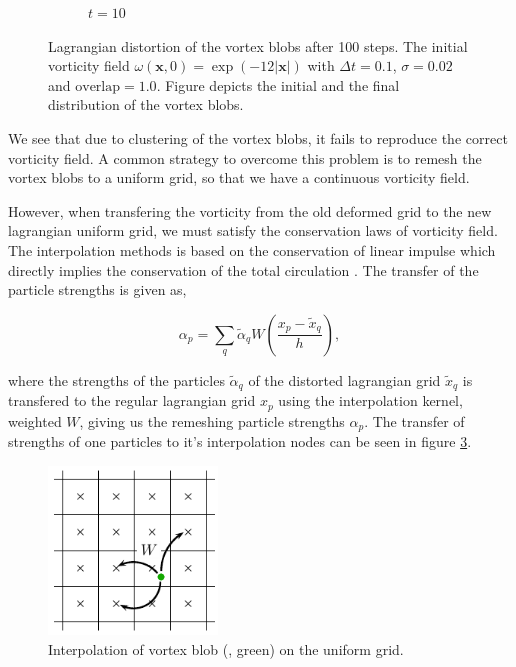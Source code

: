 \begin{figure}[t]
\begin{subfigure}[b]{0.45\textwidth}
                \caption{$t = 10$}
                \label{fig:distortion_b}
        \end{subfigure}
        \caption{Lagrangian distortion of the vortex blobs after 100 steps. The initial vorticity field $\omega\left(\mathbf{x},0\right) = \exp\left(-12\left|\mathbf{x}\right|\right)$ with $\Delta t = 0.1$, $\sigma=0.02$ and $\mathrm{overlap} = 1.0$. Figure depicts the initial and the final distribution of the vortex blobs.}
        \label{fig:distortion}
\end{figure}

We see that due to clustering of the vortex blobs, it fails to reproduce the correct vorticity field. A common strategy to overcome this problem is to remesh the vortex blobs to a uniform grid, so that we have a continuous vorticity field.

However, when transfering the vorticity from the old deformed grid to the new lagrangian uniform grid, we must satisfy the conservation laws of vorticity field. The interpolation methods is based on the conservation of linear impulse which directly implies the conservation of the total circulation \cite{Cottet2000a}. The transfer of the particle strengths is given as, 

	\begin{equation}
	\alpha_p = \sum_q\tilde{\alpha}_q W \left(\frac{x_p - \tilde{x}_q}{h}\right),	
	\end{equation}

where the strengths of the particles $\tilde{\alpha}_q$ of the distorted lagrangian grid $\tilde{x}_q$ is transfered to the regular lagrangian grid $x_p$ using the interpolation kernel, weighted $W$, giving us the remeshing particle strengths $\alpha_p$. The transfer of strengths of one particles to it's interpolation nodes can be seen in figure \ref{fig:interpolationGrid}.


	\begin{figure}[t]
	\centering
	\includegraphics[width=0.4\textwidth]{figures/lagrangian/interpolationGrid.pdf}
	\caption{Interpolation of vortex blob ({\color{darkgreen}{$\bullet$}}, green) on the uniform grid.}
	\label{fig:interpolationGrid}
	\end{figure}

